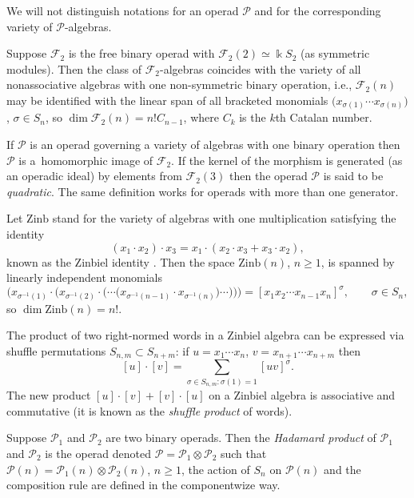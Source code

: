\documentclass[11pt]{article}
\numberwithin{equation}{section}
\numberwithin{equation}{section}
\def\Zinb{\mathrm{Zinb}}
\begin{document}
We will not distinguish notations for an operad $\mathcal P$
and for the corresponding variety of $\mathcal P$-algebras.

\begin{Example}
Suppose $\mathcal F_2$ is the free binary operad with
$\mathcal F_2(2) \simeq \Bbbk S_2$ (as symmetric modules).
Then the class of $\mathcal F_2$-algebras
coincides with the variety of all nonassociative
algebras with one non-symmetric binary operation,
i.e., $\mathcal F_2(n)$ may be identified with the
linear span of all bracketed monomials
$\bigl(x_{\sigma(1)}\cdots x_{\sigma(n)}\bigr)$, $\sigma \in S_n$,
so $\dim \mathcal F_2(n) = n! C_{n-1}$, where $C_k$ is the $k$th
Catalan number.
\end{Example}

If $\mathcal P$ is an operad governing a variety
of algebras with one binary operation then
$\mathcal P$ is a~homomorphic image of $\mathcal F_2$.
If the kernel of the morphism is generated (as an operadic ideal) by elements from $\mathcal F_2(3)$ then
the operad $\mathcal P$ is said to be {\em quadratic}.
The same definition works for operads with more than one generator.

\begin{Example}\label{exmp:Zinbiel}
Let $\Zinb$ stand for the variety of algebras with one multiplication
satisfying the identity
%
\begin{equation}\label{eq:Zinbiel}
(x_1\cdot x_2)\cdot x_3
= x_1\cdot (x_2\cdot x_3 + x_3\cdot x_2),
\end{equation}
%
known as the Zinbiel identity \cite{Loday}.
Then the space $\Zinb(n)$, $n\ge 1$, is spanned by
linearly independent monomials
\[
\bigl( x_{\sigma^{-1}(1)}\cdot \bigl(x_{\sigma^{-1}(2)}\cdot \bigl(\cdots \bigl(x_{\sigma^{-1}(n-1)}\cdot x_{\sigma^{-1}(n)}\bigr)\cdots \bigr)\bigr) \bigr)
=
[x_{1}x_{2}\cdots x_{n-1}x_{n}]^\sigma ,
\qquad \sigma \in S_n,
\]
so $\dim \Zinb(n)=n!$.

The product of two right-normed words in a Zinbiel algebra
can be expressed via shuffle permutations $S_{n,m}\subset S_{n+m}$: if $u= x_1\cdots x_n$, $v = x_{n+1}\cdots x_{n+m}$
then
\[
[u]\cdot [v]
=\sum\limits_{\sigma\in S_{n,m}\colon \sigma (1)=1}
[uv]^\sigma .
\]
The new product $[u]\cdot [v] + [v]\cdot [u]$
on a Zinbiel algebra
is associative and commutative (it is known as the {\em shuffle product}
of words).
\end{Example}


Suppose $\mathcal P_1$ and $\mathcal P_2$ are two binary operads.
Then the {\em Hadamard product} of $\mathcal P_1$ and $\mathcal P_2$ is the operad denoted
$\mathcal P= \mathcal P_1\otimes \mathcal P_2$ such that
$\mathcal P(n)= \mathcal P_1(n)\otimes \mathcal P_2(n)$, $n\ge 1$,
the action of $S_n$ on $\mathcal P(n)$ and the composition rule are defined in
the componentwize way.
\end{document}
